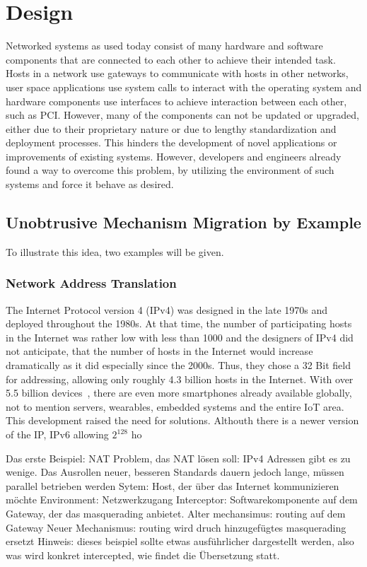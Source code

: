 \section{Design}
\label{sec:design}

Networked systems as used today consist of many hardware and software components that are connected to each other to achieve their intended task.
Hosts in a network use gateways to communicate with hosts in other networks, user space applications use system calls to interact with the operating system and hardware components use interfaces to achieve interaction between each other, such as PCI.
However, many of the components can not be updated or upgraded, either due to their proprietary nature or due to lengthy standardization and deployment processes.
This hinders the development of novel applications or improvements of existing systems.
However, developers and engineers already found a way to overcome this problem, by utilizing the environment of such systems and force it behave as desired.

\subsection{Unobtrusive Mechanism Migration by Example}
To illustrate this idea, two examples will be given.

\subsubsection{Network Address Translation}
The Internet Protocol version 4 (IPv4) was designed in the late 1970s and deployed throughout the 1980s.
At that time, the number of participating hosts in the Internet was rather low with less than 1000 and the designers of IPv4 did not anticipate, that the number of hosts in the Internet would increase dramatically as it did especially since the 2000s.
Thus, they chose a 32 Bit field for addressing, allowing only roughly 4.3 billion hosts in the Internet.
With over 5.5 billion devices~\cite{eriscsson2021report}, there are even more smartphones already available globally, not to mention servers, wearables, embedded systems and the entire IoT area.
This development raised the need for solutions.
Althouth there is a newer version of the IP, IPv6 allowing $2^128$ ho

Das erste Beispiel: NAT
Problem, das NAT lösen soll: IPv4 Adressen gibt es zu wenige. Das Ausrollen neuer, besseren Standards dauern jedoch lange, müssen parallel betrieben werden
Sytem: Host, der über das Internet kommunizieren möchte
Environment: Netzwerkzugang
Interceptor: Softwarekomponente auf dem Gateway, der das masquerading anbietet.
Alter mechansimus: routing auf dem Gateway
Neuer Mechanismus: routing wird druch hinzugefügtes masquerading ersetzt
Hinweis: dieses beispiel sollte etwas ausführlicher dargestellt werden, also was wird konkret intercepted, wie findet die Übersetzung statt.

